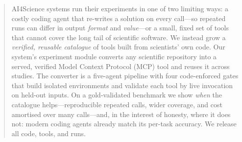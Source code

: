 \begin{abstract}
AI4Science systems run their experiments in one of two limiting ways: a costly
coding agent that re-writes a solution on every call---so repeated runs can
differ in output \emph{format} and \emph{value}---or a small, fixed set of tools
that cannot cover the long tail of scientific software. We instead grow a
\emph{verified, reusable catalogue} of tools built from scientists' own code. Our
system's experiment module converts any scientific repository into a served,
verified Model Context Protocol (MCP) tool and reuses it across studies. The
converter is a five-agent pipeline with four code-enforced gates that build
isolated environments and validate each tool by live invocation on held-out
inputs. On
a gold-validated benchmark we show \emph{when} the catalogue helps---reproducible
repeated calls, wider coverage, and cost amortised over many calls---and, in the
interest of honesty, where it does not: modern coding agents already match its
per-task accuracy. We release all code, tools, and runs.
\end{abstract}
